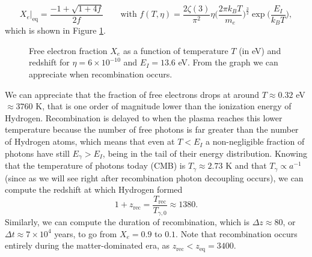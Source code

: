 $$
X_e\bigg|_\text{eq}=\frac{-1+\sqrt{1+4f}}{2f}\qquad \text{with }f(T,\eta)=\frac{2\zeta(3)}{\pi^2}\eta\bigg(\frac{2\pi k_BT}{m_e}\bigg)^{\frac{3}{2}}\exp\bigg({\frac{E_I}{k_BT}}\Bigg),
$$
which is shown in Figure \ref{fig:saha}.
\begin{figure}[ht!]
\centering
{}
\caption{Free electron fraction $X_e$ as a function of temperature $T$ (in eV) and redshift for $\eta=6\times10^{-10}$ and $E_I=13.6$ eV. From the graph we can appreciate when recombination occurs.}
\label{fig:saha}
\end{figure}
We can appreciate that the fraction of free electrons drops at around $T\approx 0.32$ eV $\approx3760$ K, that is one order of magnitude lower than the ionization energy of Hydrogen. Recombination is delayed to when the plasma reaches this lower temperature because the number of free photons is far greater than the number of Hydrogen atoms, which means that even at $T<E_I$ a non-negligible fraction of photons have still $E_\gamma>E_I$, being in the tail of their energy distribution.
Knowing that the temperature of photons today (CMB) is $T_\gamma\approx2.73$ K and that $T_\gamma\propto a^{-1}$ (since as we will see right after recombination photon decoupling occurs), we can compute the redshift at which Hydrogen formed
$$
1+z_\text{rec}=\frac{T_\text{rec}}{T_{\gamma,0}}\approx 1380.
$$
Similarly, we can compute the duration of recombination, which is $\Delta z\approx 80$, or $\Delta t\approx 7\times 10^{4}$ years, to go from $X_e=0.9$ to $0.1$. Note that recombination occurs entirely during the matter-dominated era, as $z_\text{rec}<z_\text{eq}=3400$.

